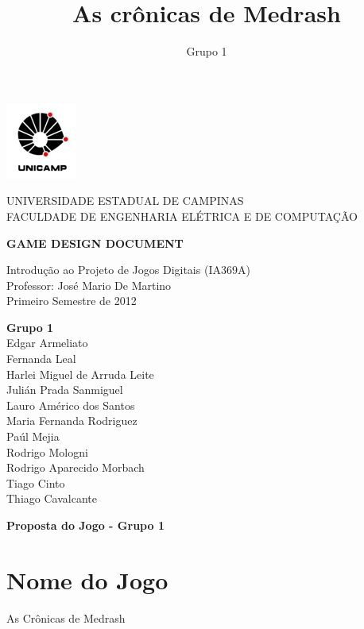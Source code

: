 \documentclass[letterpaper,11pt]{article}
\title{ As cr\^{o}nicas de Medrash }
\author{ Grupo 1 }
\date{}
\begin{document}
\begin{titlepage}
\begin{center}
\begin{minipage}{2.4 cm}
\begin{center}
\includegraphics{logo.png}
\end{center}
\end{minipage}
\begin{minipage}{12 cm}
\begin{center}
\Large
UNIVERSIDADE ESTADUAL DE CAMPINAS \\
FACULDADE DE ENGENHARIA ELÉTRICA E DE COMPUTAÇÃO
\end{center}
\end{minipage}
\end{center}

\vspace{6 cm}
\begin{center}
{\bf \large GAME DESIGN DOCUMENT}
\vspace{0.5 cm}

Introdução ao Projeto de Jogos Digitais (IA369A) \\
Professor: José Mario De Martino \\
Primeiro Semestre de 2012
\end{center}
\vspace{3 cm}
\begin{flushright}
{\bf Grupo 1} \\
Edgar Armeliato \\
Fernanda Leal \\
Harlei Miguel de Arruda Leite \\
Julián Prada Sanmiguel \\
Lauro Américo dos Santos \\
Maria Fernanda Rodriguez \\
Paúl Mejia \\
Rodrigo Mologni \\
Rodrigo Aparecido Morbach \\
Tiago Cinto \\
Thiago Cavalcante
\end{flushright}
\end{titlepage}
\newpage
\tableofcontents
\newpage

{\bf Proposta do Jogo - Grupo 1}

\section{Nome do Jogo}

As Crônicas de Medrash













\end{document}
